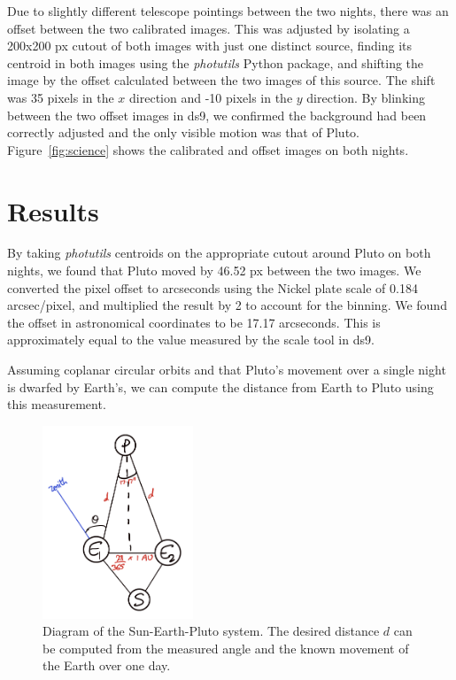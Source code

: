 \documentclass{article}
\begin{document}
   Due to slightly different telescope pointings between the two nights, there was an offset between the two calibrated images. This was adjusted by isolating a 200x200 px cutout of both images with just one distinct source, finding its centroid in both images using the \textit{photutils} Python package, and shifting the image by the offset calculated between the two images of this source. The shift was 35 pixels in the $x$ direction and -10 pixels in the $y$ direction. By blinking between the two offset images in ds9, we confirmed the background had been correctly adjusted and the only visible motion was that of Pluto. Figure~\ref{fig:science} shows the calibrated and offset images on both nights. 

    \section{Results}

    By taking \textit{photutils} centroids on the appropriate cutout around Pluto on both nights, we found that Pluto moved by 46.52 px between the two images. We converted the pixel offset to arcseconds using the Nickel plate scale of 0.184 arcsec/pixel, and multiplied the result by 2 to account for the binning. We found the offset in astronomical coordinates to be 17.17 arcseconds. This is approximately equal to the value measured by the scale tool in ds9.

    Assuming coplanar circular orbits and that Pluto's movement over a single night is dwarfed by Earth's, we can compute the distance from Earth to Pluto using this measurement. 

    \begin{figure}
        \centering
        \includegraphics[width=0.4\textwidth]{pluto_arc.jpeg}
        \caption{Diagram of the Sun-Earth-Pluto system. The desired distance $d$ can be computed from the measured angle and the known movement of the Earth over one day.}
        \label{fig:pluto_arc}
    \end{figure}
    
\end{document}
